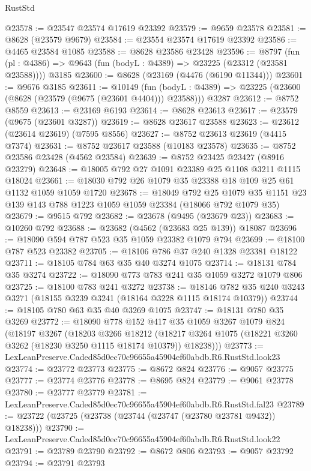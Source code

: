 \begin{lexlean}{RustStd}
\begin{coremodule}
@23578 := @23547 @23574 @17619 @23392
@23579 := @9659 @23578
@23581 := @8628 (@23579 @9679)
@23584 := @23554 @23574 @17619 @23392
@23586 := @4465 @23584 @1085
@23588 := @8628 @23586 @23428
@23596 := @8797
    (fun (pl : @4386) => @9643 (fun (bodyL : @4389) => @23225 (@23312 (@23581 @23588))))
    @3185
@23600 := @8628 (@23169 (@4476 (@6190 @11344)))
@23601 := @9676 @3185
@23611 := @10149
    (fun (bodyL : @4389) => @23225 (@23600 (@8628 (@23579 (@9675 (@23601 @4404))) @23588)))
    @3287
@23612 := @8752 @8559
@23613 := @23169 @6193
@23614 := @8628 @23613
@23617 := @23579 (@9675 (@23601 @3287))
@23619 := @8628 @23617 @23588
@23623 := @23612 (@23614 @23619) (@7595 @8556)
@23627 := @8752 @23613 @23619 (@4415 @7374)
@23631 := @8752 @23617 @23588 (@10183 @23578)
@23635 := @8752 @23586 @23428 (@4562 @23584)
@23639 := @8752 @23425 @23427 (@8916 @23279)
@23648 := @18005 @792 @27 @1091 @23389 @25 @1108 @3211 @1115 @18024
@23661 := @18030 @792 @26 @1079 @35 @23388 @18 @109 @25 @61 @1132 @1059 @1059 @1720
@23678 := @18049
    @792
    @25
    @1079
    @35
    @1151
    @23
    @139
    @143
    @788
    @1223
    @1059
    @1059
    @23384
    (@18066 @792 @1079 @35)
@23679 := @9515 @792
@23682 := @23678 (@9495 (@23679 @23))
@23683 := @10260 @792
@23688 := @23682 (@4562 (@23683 @25 @139)) @18087
@23696 := @18090 @594 @787 @523 @35 @1059 @23382 @1079 @794
@23699 := @18100 @787 @523 @23382
@23705 := @18106 @786 @37 @240 @1328 @23381 @18122
@23711 := @18105 @784 @63 @35 @40 @3274 @1075
@23714 := @18131 @784 @35 @3274
@23722 := @18090 @773 @783 @241 @35 @1059 @3272 @1079 @806
@23725 := @18100 @783 @241 @3272
@23738 := @18146 @782 @35 @240 @3243 @3271 (@18155 @3239 @3241 (@18164 @3228 @1115 @18174 @10379))
@23744 := @18105 @780 @63 @35 @40 @3269 @1075
@23747 := @18131 @780 @35 @3269
@23772 := @18090
    @778
    @152
    @417
    @35
    @1059
    @3267
    @1079
    @824
    (@18197
      @3267
      (@18203
        @3266
        @18212
        (@18217 @3264 @1075 (@18221 @3260 @3262 (@18230 @3250 @1115 @18174 @10379)) @18238)))
@23773 := LexLeanPreserve.Caded85d0ec70c96655a45904ef60abdb.R6.RustStd.look23
@23774 := @23772 @23773
@23775 := @8672 @824
@23776 := @9057 @23775
@23777 := @23774 @23776
@23778 := @8695 @824
@23779 := @9061 @23778
@23780 := @23777 @23779
@23781 := LexLeanPreserve.Caded85d0ec70c96655a45904ef60abdb.R6.RustStd.fal23
@23789 := @23722 (@23725 (@23738 (@23744 (@23747 (@23780 @23781 @9432)) @18238)))
@23790 := LexLeanPreserve.Caded85d0ec70c96655a45904ef60abdb.R6.RustStd.look22
@23791 := @23789 @23790
@23792 := @8672 @806
@23793 := @9057 @23792
@23794 := @23791 @23793

\end{coremodule}
\end{lexlean}
